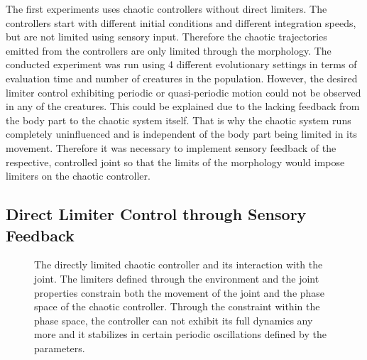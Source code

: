 \documentclass[main]{subfiles}
\begin{document}
The first experiments uses chaotic controllers without direct limiters. %
%
The controllers start with different initial conditions and different integration speeds, but are not limited using sensory input. %
%
Therefore the chaotic trajectories emitted from the controllers are only limited through the morphology. %
%
The conducted experiment was run using 4 different evolutionary settings in terms of evaluation time and number of creatures in the population. %
%
However, the desired limiter control exhibiting periodic or quasi-periodic motion could not be observed in any of the creatures. %
%
This could be explained due to the lacking feedback from the body part to the chaotic system itself. %
%
That is why the chaotic system runs completely uninfluenced and is independent of the body part being limited in its movement. %
%
Therefore it was necessary to implement sensory feedback of the respective, controlled joint so that the limits of the morphology would impose limiters on the chaotic controller.

\subsection{Direct Limiter Control through Sensory Feedback}

\begin{figure}[H]


\caption[The directly limited chaotic controller and joint complex]{The directly limited chaotic controller and its interaction with the joint. The limiters defined through the environment and the joint properties constrain both the movement of the joint and the phase space of the chaotic controller. Through the constraint within the phase space, the controller can not exhibit its full dynamics any more and it stabilizes in certain periodic oscillations defined by the parameters.}
\label{figure:direct-limit-controller-joint-complex}
\end{figure}
\end{document}
